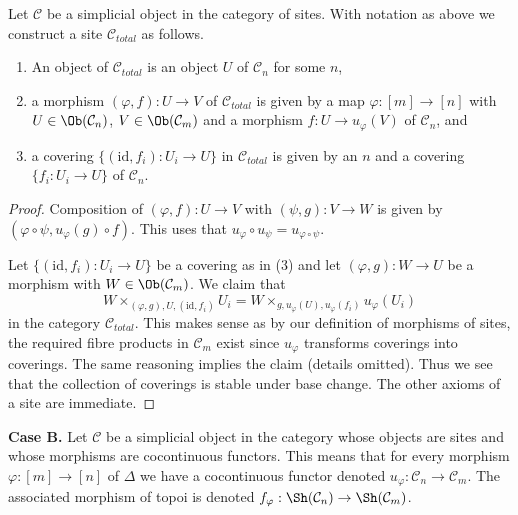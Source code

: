 \begin{lemma}
\label{lemma-simplicial-site-site}
Let $\mathcal{C}$ be a simplicial object in the category of sites.
With notation as above we construct a site $\mathcal{C}_{total}$ as follows.
\begin{enumerate}
\item An object of $\mathcal{C}_{total}$ is an object $U$ of
$\mathcal{C}_n$ for some $n$,
\item a morphism $(\varphi, f) : U \to V$ of $\mathcal{C}_{total}$
is given by a map $\varphi : [m] \to [n]$ with
$U \in \Ob(\mathcal{C}_n)$, $V \in \Ob(\mathcal{C}_m)$
and a morphism $f : U \to u_\varphi(V)$ of $\mathcal{C}_n$, and
\item a covering $\{(\text{id}, f_i) :  U_i \to U\}$ in $\mathcal{C}_{total}$
is given by an $n$ and a covering $\{f_i : U_i \to U\}$
of $\mathcal{C}_n$.
\end{enumerate}
\end{lemma}

\begin{proof}
Composition of $(\varphi, f) : U \to V$ with $(\psi, g) : V \to W$
is given by $(\varphi \circ \psi, u_\varphi(g) \circ f)$.
This uses that $u_\varphi \circ u_\psi = u_{\varphi \circ \psi}$.

\medskip\noindent
Let $\{(\text{id}, f_i) :  U_i \to U\}$ be a covering as in (3)
and let $(\varphi, g) : W \to U$ be a morphism with
$W \in \Ob(\mathcal{C}_m)$. We claim that
$$
W \times_{(\varphi, g), U, (\text{id}, f_i)} U_i =
W \times_{g, u_\varphi(U), u_\varphi(f_i)} u_\varphi(U_i)
$$
in the category $\mathcal{C}_{total}$. This makes sense as by our
definition of morphisms of sites, the required fibre products
in $\mathcal{C}_m$ exist since $u_\varphi$ transforms coverings into
coverings. The same reasoning implies the claim (details omitted).
Thus we see that the collection of coverings is stable under base
change. The other axioms of a site are immediate.
\end{proof}

\noindent
{\bf Case B.}
Let $\mathcal{C}$ be a simplicial object in the category whose objects are
sites and whose morphisms are cocontinuous functors. This means that for
every morphism $\varphi : [m] \to [n]$ of $\Delta$ we have a cocontinuous
functor denoted $u_\varphi : \mathcal{C}_n \to \mathcal{C}_m$. The associated
morphism of topoi is denoted
$f_\varphi : \Sh(\mathcal{C}_n) \to \Sh(\mathcal{C}_m)$.

